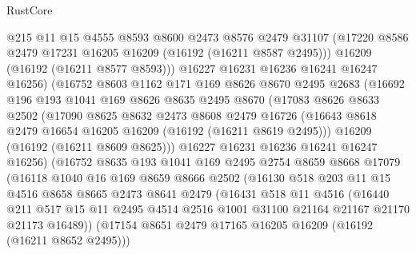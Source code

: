 \begin{lexlean}{RustCore}
\begin{coremodule}
              @215
              @11
              @15
              @4555
              @8593
              @8600
              @2473
              @8576
              @2479
              @31107
              (@17220 @8586 @2479 @17231 @16205 @16209 (@16192 (@16211 @8587 @2495)))
              @16209
              (@16192 (@16211 @8577 @8593)))
            @16227
            @16231
            @16236
            @16241
            @16247
            @16256)
          (@16752
            @8603
            @1162
            @171
            @169
            @8626
            @8670
            @2495
            @2683
            (@16692
              @196
              @193
              @1041
              @169
              @8626
              @8635
              @2495
              @8670
              (@17083
                @8626
                @8633
                @2502
                (@17090
                  @8625
                  @8632
                  @2473
                  @8608
                  @2479
                  @16726
                  (@16643 @8618 @2479 @16654 @16205 @16209 (@16192 (@16211 @8619 @2495)))
                  @16209
                  (@16192 (@16211 @8609 @8625)))
                @16227
                @16231
                @16236
                @16241
                @16247
                @16256)
              (@16752
                @8635
                @193
                @1041
                @169
                @2495
                @2754
                @8659
                @8668
                @17079
                (@16118
                  @1040
                  @16
                  @169
                  @8659
                  @8666
                  @2502
                  (@16130
                    @518
                    @203
                    @11
                    @15
                    @4516
                    @8658
                    @8665
                    @2473
                    @8641
                    @2479
                    (@16431
                      @518
                      @11
                      @4516
                      (@16440
                        @211
                        @517
                        @15
                        @11
                        @2495
                        @4514
                        @2516
                        @1001
                        @31100
                        @21164
                        @21167
                        @21170
                        @21173
                        @16489))
                    (@17154 @8651 @2479 @17165 @16205 @16209 (@16192 (@16211 @8652 @2495)))

\end{coremodule}
\end{lexlean}
